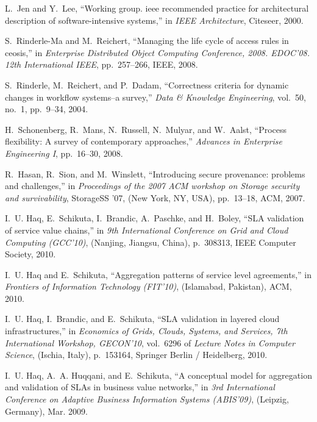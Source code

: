 \documentclass[]{article}
\begin{document}
\begin{thebibliography}{10}
L.~Jen and Y.~Lee, ``Working group. ieee recommended practice for architectural
  description of software-intensive systems,'' in {\em IEEE Architecture},
  Citeseer, 2000.

S.~Rinderle-Ma and M.~Reichert, ``Managing the life cycle of access rules in
  ceosis,'' in {\em Enterprise Distributed Object Computing Conference, 2008.
  EDOC'08. 12th International IEEE}, pp.~257--266, IEEE, 2008.

S.~Rinderle, M.~Reichert, and P.~Dadam, ``Correctness criteria for dynamic
  changes in workflow systems--a survey,'' {\em Data \& Knowledge Engineering},
  vol.~50, no.~1, pp.~9--34, 2004.

H.~Schonenberg, R.~Mans, N.~Russell, N.~Mulyar, and W.~Aalst, ``Process
  flexibility: A survey of contemporary approaches,'' {\em Advances in
  Enterprise Engineering I}, pp.~16--30, 2008.

R.~Hasan, R.~Sion, and M.~Winslett, ``Introducing secure provenance: problems
  and challenges,'' in {\em Proceedings of the 2007 ACM workshop on Storage
  security and survivability}, StorageSS '07, (New York, NY, USA), pp.~13--18,
  ACM, 2007.

I.~U. Haq, E.~Schikuta, I.~Brandic, A.~Paschke, and H.~Boley, ``{SLA}
  validation of service value chains,'' in {\em 9th International Conference on
  Grid and Cloud Computing {(GCC'10)}}, (Nanjing, Jiangsu, China),
  p.~308{\textendash}313, {IEEE} Computer Society, 2010.

I.~U. Haq and E.~Schikuta, ``Aggregation patterns of service level
  agreements,'' in {\em Frontiers of Information Technology {(FIT'10)}},
  (Islamabad, Pakistan), {ACM}, 2010.

I.~U. Haq, I.~Brandic, and E.~Schikuta, ``{SLA} validation in layered cloud
  infrastructures,'' in {\em Economics of Grids, Clouds, Systems, and Services,
  7th International Workshop, {GECON'10}}, vol.~6296 of {\em Lecture Notes in
  Computer Science}, (Ischia, Italy), p.~153{\textendash}164, Springer Berlin /
  Heidelberg, 2010.

I.~U. Haq, A.~A. Huqqani, and E.~Schikuta, ``A conceptual model for aggregation
  and validation of {SLAs} in business value networks,'' in {\em 3rd
  International Conference on Adaptive Business Information Systems
  {(ABIS'09)}}, (Leipzig, Germany), Mar. 2009.


\end{thebibliography}
\end{document}
